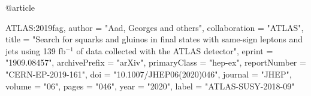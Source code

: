 @article{ATLAS:2019fag,
    author = "Aad, Georges and others",
    collaboration = "ATLAS",
    title = "{Search for squarks and gluinos in final states with same-sign leptons and jets using 139 fb$^{-1}$ of data collected with the ATLAS detector}",
    eprint = "1909.08457",
    archivePrefix = "arXiv",
    primaryClass = "hep-ex",
    reportNumber = "CERN-EP-2019-161",
    doi = "10.1007/JHEP06(2020)046",
    journal = "JHEP",
    volume = "06",
    pages = "046",
    year = "2020",
    label = "ATLAS-SUSY-2018-09"

}

